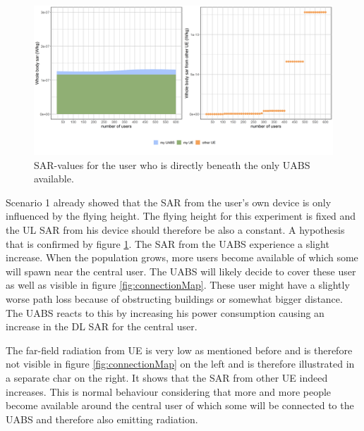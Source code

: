 \begin{figure}[h!]
\centering
  \includegraphics[width=\textwidth/6*5]{../results/s2/uvsulsarcentralUser.png}
  \caption{SAR-values for the user who is directly beneath the only UABS available.}
  \label{fig:uvsulsarcentralUsers}
\end{figure}

Scenario 1 already showed that the \gls{SAR} from the user's own device is only influenced by the flying height. 
The flying height for this experiment is fixed and the \gls{UL} \gls{SAR} from his device should therefore be also a constant. 
A hypothesis that is confirmed by figure \ref{fig:uvsulsarcentralUsers}.
The \gls{SAR} from the \gls{UABS} experience a slight  increase. When the population grows, more users become available 
of which some will spawn near the central user. The \gls{UABS} will likely decide to cover these user  as well as visible in figure \ref{fig:connectionMap}.
These user might have a slightly 
worse path loss because of obstructing buildings or somewhat bigger distance. The \gls{UABS} reacts to this by increasing 
his power consumption causing an increase in the \gls{DL} \gls{SAR} for the central user.

The far-field radiation from \gls{UE} is very low as mentioned before and is therefore not visible in figure \ref{fig:connectionMap} 
on the left and is therefore illustrated in a separate char on the right. 
It shows that the \gls{SAR}  from other \gls{UE} indeed increases. This is normal 
behaviour considering that more and more people become available around the central user of which some will be connected to the \gls{UABS}
and therefore also emitting radiation.

